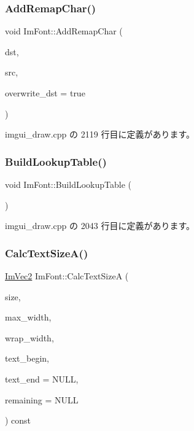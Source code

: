 \subsubsection{\texorpdfstring{Add\+Remap\+Char()}{AddRemapChar()}}
{\footnotesize\ttfamily void Im\+Font\+::\+Add\+Remap\+Char (\begin{DoxyParamCaption}\item[{\mbox{\hyperlink{imgui_8h_af2c7badaf05a0008e15ef76d40875e97}{Im\+Wchar}}}]{dst,  }\item[{\mbox{\hyperlink{imgui_8h_af2c7badaf05a0008e15ef76d40875e97}{Im\+Wchar}}}]{src,  }\item[{bool}]{overwrite\+\_\+dst = {\ttfamily true} }\end{DoxyParamCaption})}



 imgui\+\_\+draw.\+cpp の 2119 行目に定義があります。

\mbox{\label{struct_im_font_a04b3a1437bd0032722bbbd3613941162}} 
\subsubsection{\texorpdfstring{Build\+Lookup\+Table()}{BuildLookupTable()}}
{\footnotesize\ttfamily void Im\+Font\+::\+Build\+Lookup\+Table (\begin{DoxyParamCaption}{ }\end{DoxyParamCaption})}



 imgui\+\_\+draw.\+cpp の 2043 行目に定義があります。

\mbox{\label{struct_im_font_ad67f64fd206ad197f4b93b1a1ae27cfe}} 
\subsubsection{\texorpdfstring{Calc\+Text\+Size\+A()}{CalcTextSizeA()}}
{\footnotesize\ttfamily \mbox{\hyperlink{struct_im_vec2}{Im\+Vec2}} Im\+Font\+::\+Calc\+Text\+SizeA (\begin{DoxyParamCaption}\item[{float}]{size,  }\item[{float}]{max\+\_\+width,  }\item[{float}]{wrap\+\_\+width,  }\item[{const char $\ast$}]{text\+\_\+begin,  }\item[{const char $\ast$}]{text\+\_\+end = {\ttfamily NULL},  }\item[{const char $\ast$$\ast$}]{remaining = {\ttfamily NULL} }\end{DoxyParamCaption}) const}



